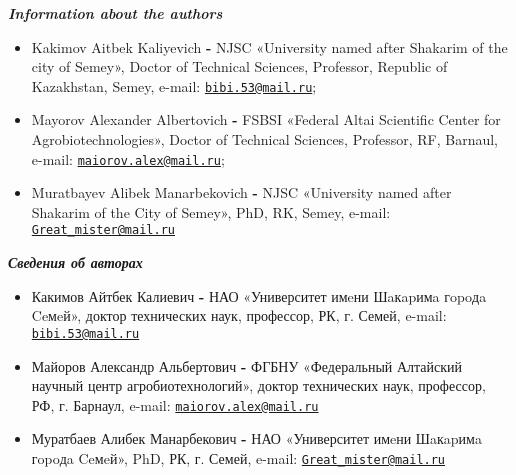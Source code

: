 \emph{{\bfseries Information about the authors}}

\begin{itemize}
\item
Kakimov Aitbek Kaliyevich {\bfseries -} NJSC «University named after
Shakarim of the city of Semey», Doctor of Technical Sciences, Professor,
Republic of Kazakhstan, Semey, e-mail:
\href{mailto:bibi.53@mail.ru}{\nolinkurl{bibi.53@mail.ru}};

\item
Mayorov Alexander Albertovich {\bfseries -} FSBSI «Federal Altai Scientific
Center for Agrobiotechnologies», Doctor of Technical Sciences,
Professor, RF, Barnaul, e-mail:
\href{mailto:maiorov.alex@mail.ru}{\nolinkurl{maiorov.alex@mail.ru}};

\item
Muratbayev Alibek Manarbekovich {\bfseries -} NJSC «University named after
Shakarim of the City of Semey», PhD, RK, Semey, e-mail:
\href{mailto:Great_mister@mail.ru}{\nolinkurl{Great\_mister@mail.ru}}
\end{itemize}

\emph{{\bfseries Сведения об авторах}}

\begin{itemize}
\item
Какимов Айтбек Калиевич {\bfseries -} НАО «Университет имeни Шaкapимa
гopoдa Ceмeй», доктор технических наук, профессор, РК, г. Семей, e-mail:
\href{mailto:bibi.53@mail.ru}{\nolinkurl{bibi.53@mail.ru}}

\item
Майоров Александр Альбертович {\bfseries -} ФГБНУ «Федеральный Алтайский
научный центр агробиотехнологий», доктор технических наук, профессор,
РФ, г. Барнаул, e-mail:
\href{mailto:maiorov.alex@mail.ru}{\nolinkurl{maiorov.alex@mail.ru}}

\item
Муратбаев Алибек Манарбекович {\bfseries -} НАО «Университет имeни Шaкapимa
гopoдa Ceмeй», PhD, РК, г. Семей, e-mail:
\href{mailto:Great_mister@mail.ru}{\nolinkurl{Great\_mister@mail.ru}}
\end{itemize}
